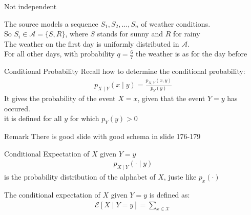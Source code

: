 \begin{parag}{Not independent}
    \begin{definition}
        The source models a sequence $S_1, S_2, \dots, S_n$ of weather conditions.
        \\
        So $S_i \in \mathcal{A} = \{S, R\}$, where $S$ stands for sunny and $R$ for rainy\\
        The weather on the first day is uniformly distributed in $ \mathcal{A}$.
        \\
        For all other days, with probability $q = \frac{6}{7}$ the weather is as for the day before
    \end{definition}
    

\end{parag}


 \begin{parag}{Conditional Probability}
     Recall how to determine the conditional probability:
     \begin{align*}
         p_{X\mid Y}(x \mid y) = \frac{p_{X, Y}(x, y)}{p_Y(y)}
     \end{align*}
     It gives the probability of the event $X = x$, given that the event $Y = y$ has occured. \\ it is defined for all $y$ for which $p_Y(y) > 0$
     \begin{subparag}{Remark}
         There is good slide with good schema in slide 176-179
         
     \end{subparag}
 \end{parag}

 \begin{parag}{Conditional Expectation of $X$ given $Y = y$}
     \begin{align*}
         p_{X \mid Y}( \cdot \mid y)
     \end{align*}
     is the probability distribution of the alphabet of $X$, juste like $p_x( \cdot)$
     \begin{definition}
         The conditional expectation of $X$ given $Y = y$ is defined as:
         \begin{align*}
             \mathcal{E}[X \mid Y = y] = \sum_{ x \in \mathcal{X}}
         \end{align*}
         
     \end{definition}
     
     
 
 \end{parag}

